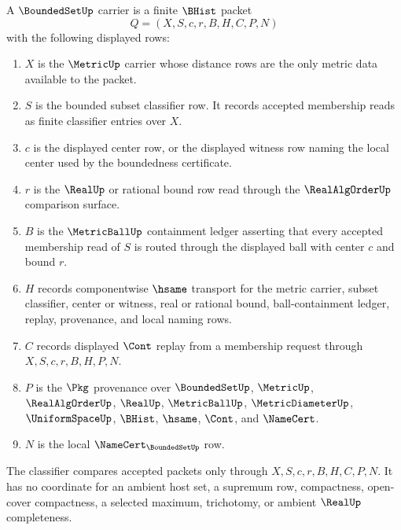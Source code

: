 \begin{definition}
\label{def:bounded-set-carrier}
A $\BoundedSetUp$ carrier is a finite $\BHist$ packet
$$
Q=(X,S,c,r,B,H,C,P,N)
$$
with the following displayed rows:
\begin{enumerate}
\item $X$ is the $\MetricUp$ carrier whose distance rows are the only metric data available to the packet.
\item $S$ is the bounded subset classifier row. It records accepted membership reads as finite classifier entries over $X$.
\item $c$ is the displayed center row, or the displayed witness row naming the local center used by the boundedness certificate.
\item $r$ is the $\RealUp$ or rational bound row read through the $\RealAlgOrderUp$ comparison surface.
\item $B$ is the $\MetricBallUp$ containment ledger asserting that every accepted membership read of $S$ is routed through the displayed ball with center $c$ and bound $r$.
\item $H$ records componentwise $\hsame$ transport for the metric carrier, subset classifier, center or witness, real or rational bound, ball-containment ledger, replay, provenance, and local naming rows.
\item $C$ records displayed $\Cont$ replay from a membership request through $X,S,c,r,B,H,P,N$.
\item $P$ is the $\Pkg$ provenance over $\BoundedSetUp$, $\MetricUp$, $\RealAlgOrderUp$, $\RealUp$, $\MetricBallUp$, $\MetricDiameterUp$, $\UniformSpaceUp$, $\BHist$, $\hsame$, $\Cont$, and $\NameCert$.
\item $N$ is the local $\NameCert_{\BoundedSetUp}$ row.
\end{enumerate}
The classifier compares accepted packets only through $X,S,c,r,B,H,C,P,N$. It has no coordinate for an ambient host set, a supremum row, compactness, open-cover compactness, a selected maximum, trichotomy, or ambient $\RealUp$ completeness.
\end{definition}

